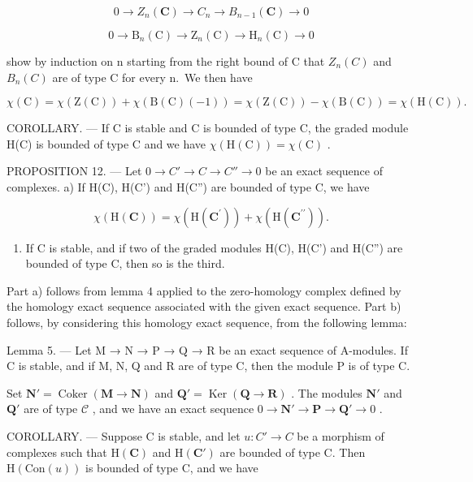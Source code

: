 \[
0 \to Z _ {n} (\mathbf {C}) \to C _ {n} \to B _ {n - 1} (\mathbf {C}) \to 0
\]

\[
0 \to \mathrm{B} _ {n} (\mathrm{C}) \to \mathrm{Z} _ {n} (\mathrm{C}) \to \mathrm{H} _ {n} (\mathrm{C}) \to 0
\]

show by induction on n starting from the right bound of C that \(Z_{n}(C)\) and \(B_{n}(C)\) are of type C for every n.~We then have

\[
\chi (\mathrm{C}) = \chi (\mathrm{Z} (\mathrm{C})) + \chi (\mathrm{B} (\mathrm{C}) (- 1)) = \chi (\mathrm{Z} (\mathrm{C})) - \chi (\mathrm{B} (\mathrm{C})) = \chi (\mathrm{H} (\mathrm{C})).
\]

COROLLARY. --- If C is stable and C is bounded of type C, the graded module H(C) is bounded of type C and we have \(\chi(\mathrm{H}(\mathrm{C})) = \chi(\mathrm{C})\) .

PROPOSITION 12. --- Let \(0 \to C' \to C \to C'' \to 0\) be an exact sequence of complexes. a) If H(C), H(C') and H(C'') are bounded of type C, we have

\[
\chi (\mathrm{H} (\mathbf {C})) = \chi (\mathrm{H} (\mathbf {C} ^ {\prime})) + \chi (\mathrm{H} (\mathbf {C} ^ {\prime \prime})) .
\]

\begin{enumerate}
\def\labelenumi{\alph{enumi})}
\setcounter{enumi}{1}
\tightlist
\item
  If C is stable, and if two of the graded modules H(C), H(C') and H(C'') are bounded of type C, then so is the third.
\end{enumerate}

Part a) follows from lemma 4 applied to the zero-homology complex defined by the homology exact sequence associated with the given exact sequence. Part b) follows, by considering this homology exact sequence, from the following lemma:

Lemma 5. --- Let M → N → P → Q → R be an exact sequence of A-modules. If C is stable, and if M, N, Q and R are of type C, then the module P is of type C.

Set \(\mathbf{N}' = \operatorname{Coker} (\mathbf{M} \to \mathbf{N})\) and \(\mathbf{Q}' = \operatorname{Ker} (\mathbf{Q} \to \mathbf{R})\) . The modules \(\mathbf{N}'\) and \(\mathbf{Q}'\) are of type \(\mathcal{C}\) , and we have an exact sequence \(0 \to \mathbf{N}' \to \mathbf{P} \to \mathbf{Q}' \to 0\) .

COROLLARY. --- Suppose C is stable, and let \(u : C' \to C\) be a morphism of complexes such that \(\mathrm{H}(\mathbf{C})\) and \(\mathrm{H}(\mathbf{C}')\) are bounded of type C. Then \(\mathrm{H}(\mathrm{Con}(u))\) is bounded of type C, and we have

